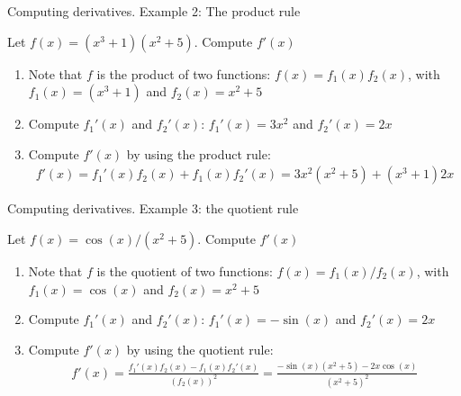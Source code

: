 \documentclass[9pt]{beamer}
\begin{document}
\begin{frame}{Computing derivatives. Example 2: The product rule}

        Let $f(x) = (x^3 + 1)(x^2 + 5)$. Compute $f'(x)$

        \begin{enumerate}[leftmargin = 0.5cm, label = \arabic*., rightmargin = 0.2cm]

        \item Note that $f$ is the product of two functions: $f(x) = f_1(x)f_2(x)$, with $f_1(x) = (x^3 + 1)$ and $f_2(x) = x^2 + 5$

        \item Compute $f_1'(x)$ and $f_2'(x)$: $f_1'(x) = 3x^2$ and $f_2'(x) = 2x$

        \item Compute $f'(x)$ by using the product rule:
        \begin{align*}
            f'(x) = f_1'(x)f_2(x) + f_1(x)f_2'(x) = 3x^2(x^2 + 5) + (x^3 + 1)2x
        \end{align*} 
        
        \end{enumerate}
    
\end{frame}

\begin{frame}{Computing derivatives. Example 3: the quotient rule}

        Let $f(x) = \cos(x)/(x^2 + 5)$. Compute $f'(x)$

        \begin{enumerate}[leftmargin = 0.5cm, label = \arabic*., rightmargin = 0.2cm]

        \item Note that $f$ is the quotient of two functions: $f(x) = f_1(x)/f_2(x)$, with $f_1(x) = \cos(x)$ and $f_2(x) = x^2 + 5$

        \item Compute $f_1'(x)$ and $f_2'(x)$: $f_1'(x) = -\sin(x)$ and $f_2'(x) = 2x$

        \item Compute $f'(x)$ by using the quotient rule: 
        \begin{align*}
            f'(x) = \frac{f_1'(x)f_2(x) - f_1(x)f_2'(x)}{(f_2(x))^2} = \frac{-\sin(x)(x^2 + 5) -2x\cos(x)}{(x^2 + 5)^2}
        \end{align*} 
        
        \end{enumerate}
    
\end{frame}
\end{document}
